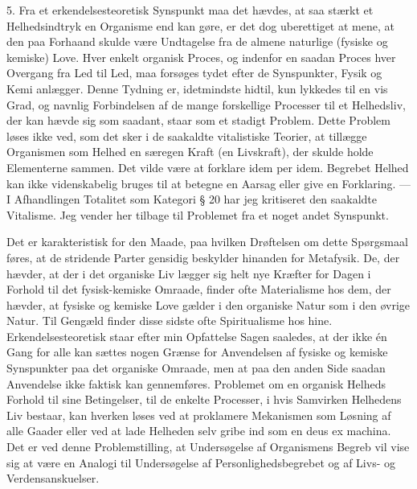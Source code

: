 \documentclass[12pt]{article}
\newcommand{\opage}[1]{\marginnote{\footnotesize\textit{[#1]}}}
\begin{document}
5. Fra et erkendelsesteoretisk Synspunkt maa det hævdes, at saa stærkt
et Helhedsindtryk en Organisme end kan gøre, er det dog uberettiget at
mene, at den paa Forhaand skulde være Undtagelse fra de almene
naturlige (fysiske og kemiske) Love. Hver enkelt organisk Proces, og
indenfor en saadan Proces hver Overgang fra Led til Led, maa forsøges
tydet efter de Synspunkter, Fysik og Kemi anlægger. Denne Tydning er,
idetmindste hidtil, kun lykkedes til en vis Grad, og navnlig
Forbindelsen af de mange forskellige Processer til et Helhedsliv, der
kan hævde sig som saadant, staar som et stadigt Problem. Dette Problem
løses ikke ved, som det sker i de saakaldte
\opage{23}vitalistiske Teorier, at tillægge Organismen som Helhed en
særegen Kraft (en \guillemotright{}Livskraft\guillemotleft{}), der skulde holde Elementerne sammen.
Det vilde være at forklare idem per idem. Begrebet Helhed kan ikke
videnskabelig bruges til at betegne en Aarsag eller give en
Forklaring. --- I Afhandlingen \guillemotright{}Totalitet som Kategori\guillemotleft{} § 20 har jeg
kritiseret den saakaldte Vitalisme. Jeg vender her tilbage til
Problemet fra et noget andet Synspunkt.

Det er karakteristisk for den Maade, paa hvilken Drøftelsen om dette
Spørgsmaal føres, at de stridende Parter gensidig beskylder hinanden
for \guillemotright{}Metafysik\guillemotleft{}. De, der hævder, at der i det organiske Liv lægger sig
helt nye Kræfter for Dagen i Forhold til det fysisk-kemiske Omraade,
finder ofte \guillemotright{}Materialisme\guillemotleft{} hos dem, der hævder, at fysiske og kemiske
Love gælder i den organiske Natur som i den øvrige Natur. Til Gengæld
finder disse sidste ofte \guillemotright{}Spiritualisme\guillemotleft{} hos hine.
Erkendelsesteoretisk staar efter min Opfattelse Sagen saaledes, at der
ikke én Gang for alle kan sættes nogen Grænse for Anvendelsen af
fysiske og kemiske Synspunkter paa det organiske Omraade, men at paa
den anden Side saadan Anvendelse ikke faktisk kan gennemføres.
Problemet om en organisk Helheds Forhold til sine Betingelser, til de
enkelte Processer, i hvis Samvirken Helhedens Liv bestaar, kan hverken
løses ved at proklamere Mekanismen som Løsning af alle Gaader eller
ved at lade Helheden \guillemotright{}selv\guillemotleft{} gribe ind som en deus ex machina. Det er
ved denne Problemstilling, at Undersøgelse af Organismens Begreb vil
vise sig at være en Analogi til Undersøgelse af Personlighedsbegrebet
og af Livs- og Verdensanskuelser.
\end{document}
